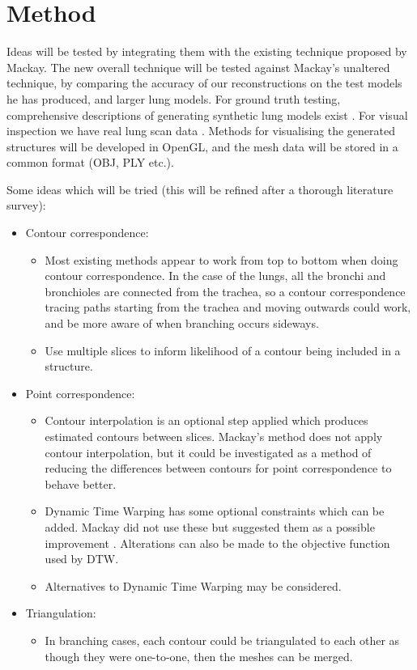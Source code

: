 \documentclass[12pt]{article}
\begin{document}
\section{Method}

Ideas will be tested by integrating them with the existing technique proposed by Mackay. The new overall technique will be tested against Mackay’s unaltered technique, by comparing the accuracy of our reconstructions on the test models he has produced, and larger lung models. For ground truth testing, comprehensive descriptions of generating synthetic lung models exist \cite{pluta2012new}. For visual inspection we have real lung scan data \cite{mukundan2016reconstruction}. Methods for visualising the generated structures will be developed in OpenGL, and the mesh data will be stored in a common format (OBJ, PLY etc.). 

Some ideas which will be tried (this will be refined after a thorough literature survey):
\begin{itemize}
\item Contour correspondence:
\begin{itemize}
\item Most existing methods appear to work from top to bottom when doing contour correspondence. In the case of the lungs, all the bronchi and bronchioles are connected from the trachea, so a contour correspondence tracing paths starting from the trachea and moving outwards could work, and be more aware of when branching occurs sideways.
\item Use multiple slices to inform likelihood of a contour being included in a structure.
\end{itemize}

\item Point correspondence:
\begin{itemize}
\item Contour interpolation is an optional step applied which produces estimated contours between slices. Mackay’s method does not apply contour interpolation, but it could be investigated as a method of reducing the differences between contours for point correspondence to behave better.
\item Dynamic Time Warping has some optional constraints which can be added. Mackay did not use these but suggested them as a possible improvement \cite{mackay2019robust}. Alterations can also be made to the objective function used by DTW.
\item Alternatives to Dynamic Time Warping may be considered.
\end{itemize}

\item Triangulation:
\begin{itemize}
\item In branching cases, each contour could be triangulated to each other as though they were one-to-one, then the meshes can be merged.
\end{itemize}
\end{itemize}
\end{document}
